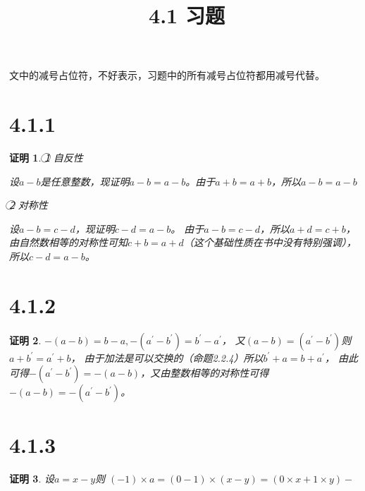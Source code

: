 \documentclass{article}
\theoremstyle{mystyle}
\theoremstyle{zproofstyle}
\newtheorem*{zproof}{证明}
\begin{document}
\title{4.1 习题}
\maketitle

文中的减号占位符，不好表示，习题中的所有减号占位符都用减号代替。

\section*{4.1.1}
\begin{zproof}
  \textcircled{1} 自反性

  设$a-b$是任意整数，现证明$a-b=a-b$。由于$a+b=a+b$，所以$a-b=a-b$

  \textcircled{2} 对称性

  设$a-b=c-d$，现证明$c-d=a-b$。
  由于$a-b=c-d$，所以$a+d=c+b$，由自然数相等的对称性可知$c+b=a+d$（这个基础性质在书中没有特别强调），所以$c-d=a-b$。
\end{zproof}

\section*{4.1.2}
\begin{zproof}
  $-(a-b)=b-a,-(a^\prime - b^\prime)=b^\prime - a^\prime$，
  又$(a-b)=(a^\prime - b^\prime)$则$a+b^\prime = a^\prime + b$，
  由于加法是可以交换的（命题2.2.4）所以$b^\prime + a = b + a^\prime$，
  由此可得$-(a^\prime - b^\prime)=-(a-b)$，又由整数相等的对称性可得$-(a-b)=-(a^\prime - b^\prime)$。
\end{zproof}

\section*{4.1.3}
\begin{zproof}
  设$a = x-y$则
  $(-1)\times a=(0-1) \times (x-y)= (0 \times x + 1 \times y) - $
\end{zproof}
\end{document}

